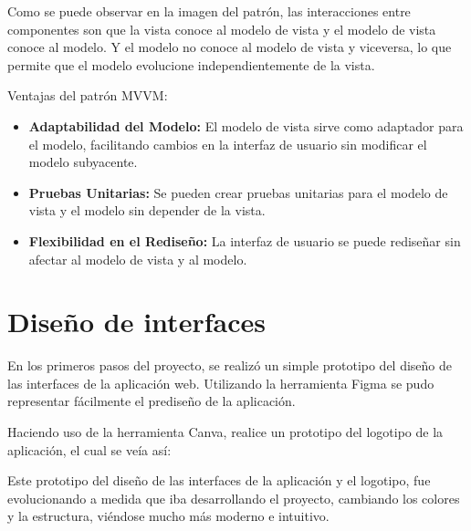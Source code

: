 
Como se puede observar en la imagen del patrón, las interacciones entre componentes son que la vista conoce al modelo de vista y el modelo de vista conoce al modelo. Y el modelo no conoce al modelo de vista y viceversa, lo que permite que el modelo evolucione independientemente de la vista.

\hfill

Ventajas del patrón MVVM:
\begin{itemize}
\tightlist
    \item \textbf{Adaptabilidad del Modelo:} El modelo de vista sirve como adaptador para el modelo, facilitando cambios en la interfaz de usuario sin modificar el modelo subyacente.
    \item \textbf{Pruebas Unitarias:} Se pueden crear pruebas unitarias para el modelo de vista y el modelo sin depender de la vista.
    \item \textbf{Flexibilidad en el Rediseño:} La interfaz de usuario se puede rediseñar sin afectar al modelo de vista y al modelo.
\end{itemize}

\clearpage

\section{Diseño de interfaces}

En los primeros pasos del proyecto, se realizó un simple prototipo del diseño de las interfaces de la aplicación web. Utilizando la herramienta Figma se pudo representar fácilmente el prediseño de la aplicación.



\hfill

Haciendo uso de la herramienta Canva, realice un prototipo del logotipo de la aplicación, el cual se veía así:

\vfill

Este prototipo del diseño de las interfaces de la aplicación y el logotipo, fue evolucionando a medida que iba desarrollando el proyecto, cambiando los colores y la estructura, viéndose mucho más moderno e intuitivo.

